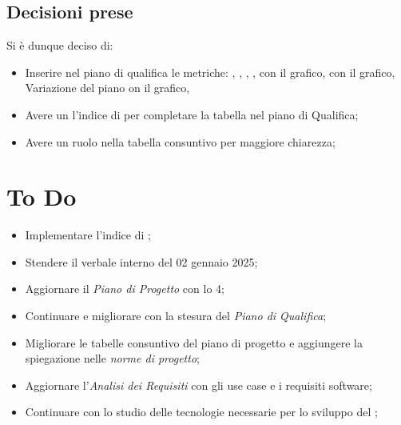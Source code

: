 \documentclass[a4paper, 12pt]{article}
\begin{document}
\subsection{Decisioni prese}
Si è dunque deciso di:
\begin{itemize}
    \item Inserire nel piano di qualifica le metriche:
    , 
    ,
    ,
    ,
     con il grafico,
     con il grafico,
    Variazione del piano on il grafico,
    \item Avere un l'indice di  per completare la tabella nel piano di Qualifica;
    \item Avere un ruolo nella tabella consuntivo per maggiore chiarezza;
    
\end{itemize}
\section{To Do}
\begin{itemize}
    \item Implementare l'indice di ;
    \item Stendere il verbale interno del 02 gennaio 2025;
    \item Aggiornare il \textit{Piano di Progetto} con lo  4;
    \item Continuare e migliorare con la stesura del \textit{Piano di Qualifica};
    \item Migliorare le tabelle consuntivo del piano di progetto e aggiungere la spiegazione nelle \textit{norme di progetto};
    \item Aggiornare l'\textit{Analisi dei Requisiti} con gli use case e i requisiti software;
    \item Continuare con lo studio delle tecnologie necessarie per lo sviluppo del ;
\end{itemize}
\end{document}
